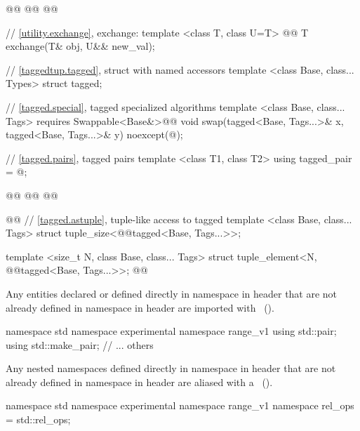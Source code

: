 \begin{codeblock}
@@
  @@
  @@

  // \ref{utility.exchange}, exchange:
  template <class T, class U=T>
    @@
  T exchange(T& obj, U&& new_val);
\end{codeblock}
{\color{addclr}
\begin{codeblock}
  // \ref{taggedtup.tagged}, struct with named accessors
  template <class Base, class... Types> struct tagged;

  // \ref{tagged.special}, tagged specialized algorithms
  template <class Base, class... Tags>
    requires Swappable<Base&>@\newtxt{()}@
  void swap(tagged<Base, Tags...>& x, tagged<Base, Tags...>& y) noexcept(@\seebelow@);

  // \ref{tagged.pairs}, tagged pairs
  template <class T1, class T2> using tagged_pair = @\seebelow@;

  @@
  @@
@\newtxt{\}\}\}}@

@@
  // \ref{tagged.astuple}, tuple-like access to tagged
  template <class Base, class... Tags>
  struct tuple_size<@@tagged<Base, Tags...>>;
  
  template <size_t N, class Base, class... Tags>
  struct tuple_element<N, @@tagged<Base, Tags...>>;
@\newtxt{\}}@
\end{codeblock}
}

{\color{newclr}
\pnum
Any entities declared or defined directly in namespace  in header 
that are not already defined in namespace  in header
 are imported with
~(). \enterexample
\begin{codeblock}
namespace std { namespace experimental { namespace range_v1 {
  using std::pair;
  using std::make_pair;
  // ... others
}}}
\end{codeblock}
\exitexample

\pnum
Any nested namespaces defined directly in namespace  in header 
that are not already defined in namespace  in header
 are aliased with a
~(). \enterexample
\begin{codeblock}
namespace std { namespace experimental { namespace range_v1 {
  namespace rel_ops = std::rel_ops;
}}}
\end{codeblock}
\exitexample
}

